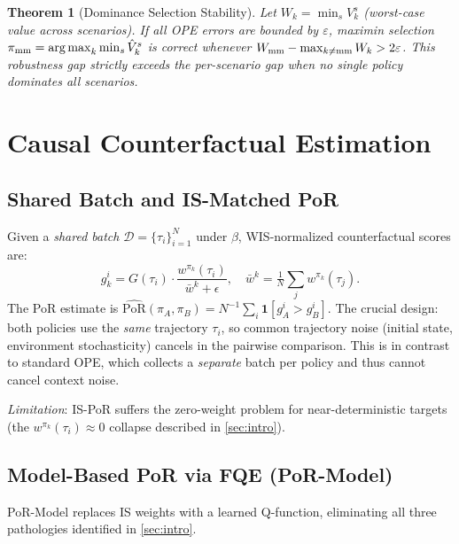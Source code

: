 \documentclass[10pt]{article}
\theoremstyle{plain}
\newtheorem{theorem}{Theorem}
\theoremstyle{definition}
\theoremstyle{remark}
\newcommand{\PoR}{\mathrm{PoR}}
\newcommand{\piA}{\pi_A}
\newcommand{\piB}{\pi_B}
\newcommand{\calD}{\mathcal{D}}
\DeclareMathOperator*{\argmax}{arg\,max}
\begin{document}
\begin{theorem}[Dominance Selection Stability]
  \label{thm:maximin}
  Let $W_k=\min_s V^s_k$ (worst-case value across scenarios).  If all OPE
  errors are bounded by $\varepsilon$, maximin selection
  $\pi_{\rm mm}=\argmax_k\min_s\hat{V}^s_k$ is correct whenever
  $W_{\rm mm}-\max_{k\neq{\rm mm}}W_k>2\varepsilon$.
  This \emph{robustness gap} strictly exceeds the per-scenario gap when no
  single policy dominates all scenarios.
\end{theorem}

\section{Causal Counterfactual Estimation}
\label{sec:method}

\subsection{Shared Batch and IS-Matched PoR}

Given a \emph{shared batch} $\calD=\{\tau_i\}_{i=1}^N$ under $\beta$,
WIS-normalized counterfactual scores are:
\begin{equation}
  g_k^i = G(\tau_i)\cdot\frac{w^{\pi_k}(\tau_i)}{\bar{w}^k+\epsilon},
  \quad \bar{w}^k=\tfrac{1}{N}\textstyle\sum_j w^{\pi_k}(\tau_j).
  \label{eq:wis_scores}
\end{equation}
The PoR estimate is $\widehat{\PoR}(\piA,\piB)=N^{-1}\sum_i\mathbf{1}[g_A^i>g_B^i]$.
The crucial design: both policies use the \emph{same} trajectory $\tau_i$,
so common trajectory noise (initial state, environment stochasticity) cancels
in the pairwise comparison.  This is in contrast to standard OPE, which
collects a \emph{separate} batch per policy and thus cannot cancel context noise.

\emph{Limitation}: IS-PoR suffers the zero-weight problem for near-deterministic
targets (the $w^{\pi_k}(\tau_i)\approx 0$ collapse described in \cref{sec:intro}).

\subsection{Model-Based PoR via FQE (PoR-Model)}
\label{sec:por_model}

PoR-Model replaces IS weights with a learned Q-function, eliminating all three
pathologies identified in \cref{sec:intro}.
\end{document}
